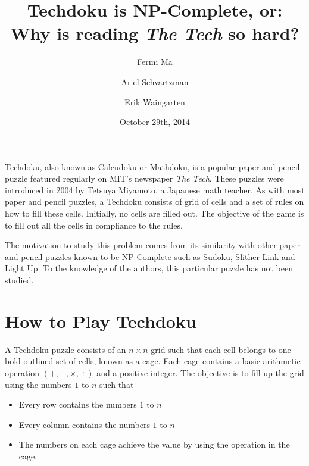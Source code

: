 \documentclass[runningheads,a4paper]{llncs}
\date{October 29th, 2014}							%
\begin{document}
\title{Techdoku is NP-Complete, or: Why is reading \textit{The Tech} so hard?}

\author{Fermi Ma \and Ariel Schvartzman \and Erik Waingarten}
%


\maketitle

Techdoku, also known as Calcudoku or Mathdoku, is a popular paper and pencil puzzle featured regularly on MIT's newspaper \textit{The Tech}. These puzzles were introduced in 2004 by Tetsuya Miyamoto, a Japanese math teacher. As with most paper and pencil puzzles, a Techdoku consists of grid of cells and a set of rules on how to fill these cells. Initially, no cells are filled out. The objective of the game is to fill out all the cells in compliance to the rules. 

The motivation to study this problem comes from its similarity with other paper and pencil puzzles known to be NP-Complete such as Sudoku, Slither Link and Light Up. To the knowledge of the authors, this particular puzzle has not been studied. 

\section{How to Play Techdoku}

A Techdoku puzzle consists of an $n \times n$ grid such that each cell belongs to one bold outlined set of cells, known as a cage. Each cage contains a basic arithmetic operation $(+, - , \times, \div )$ and a positive integer. The objective is to fill up the grid using the numbers $1$ to $n$ such that 

\begin{itemize}
	\item Every row contains the numbers $1$ to $n$
	\item Every column contains the numbers $1$ to $n$
	\item The numbers on each cage achieve the value by using the operation in the cage. 
\end{itemize}
\end{document}
